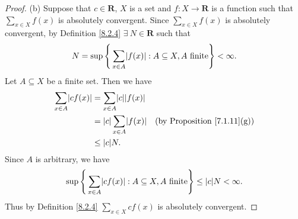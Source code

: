 \begin{proof}{(b)}
    Suppose that \(c \in \mathbf{R}\), \(X\) is a set and \(f : X \to \mathbf{R}\) is a function such that \(\sum_{x \in X} f(x)\) is absolutely convergent.
    Since \(\sum_{x \in X} f(x)\) is absolutely convergent, by Definition \ref{8.2.4} \(\exists\ N \in \mathbf{R}\) such that
    \[
        N = \sup\Bigg\{\sum_{x \in A} \abs*{f(x)} : A \subseteq X, A \text{ finite}\Bigg\} < \infty.
    \]
    Let \(A \subseteq X\) be a finite set.
    Then we have
    \begin{align*}
        \sum_{x \in A} \abs*{cf(x)} & = \sum_{x \in A} \abs*{c}\abs*{f(x)}                                           \\
                                    & = \abs*{c}\sum_{x \in A} \abs*{f(x)} & \text{(by Proposition \ref{7.1.11}(g))} \\
                                    & \leq \abs*{c} N.
    \end{align*}
    Since \(A\) is arbitrary, we have
    \[
        \sup\Bigg\{\sum_{x \in A} \abs*{cf(x)} : A \subseteq X, A \text{ finite}\Bigg\} \leq \abs*{c}N < \infty.
    \]
    Thus by Definition \ref{8.2.4} \(\sum_{x \in X} cf(x)\) is absolutely convergent.


\end{proof}
